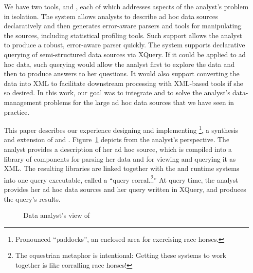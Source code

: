 
We have two tools, \pads{} and \Galax{}, each of which addresses aspects of the analyst's
problem in isolation.  The \pads{} system allows analysts to describe ad hoc data
sources declaratively and then generates error-aware parsers and tools
for manipulating the sources, including statistical profiling tools.
Such support allows the analyst to produce a robust, error-aware
parser quickly.  The \Galax{} system supports declarative querying of
semi-structured data sources via XQuery.  If it could be applied to ad
hoc data, such querying would allow the analyst first to explore the
data and then to produce answers to her questions.  It would also support
converting the data into XML to 
facilitate downstream processing with XML-based tools if she so
desired.  In this work, our goal was to integrate \pads{} and \Galax{}
to solve the analyst's data-management problems for the large ad hoc
data sources that we have seen in practice.

This paper describes our experience designing and implementing
\padx{}\footnote{%
  Pronounced ``paddocks'', an enclosed area for exercising race
  horses.},
a synthesis and extension of \pads{} and 
\Galax{}.  Figure~\ref{figure:padx-arch1} depicts \padx{} from the
analyst's perspective.  The analyst provides a \pads{} description of
her ad hoc source, which is compiled into a library of components for
parsing her data and for viewing and querying it as XML.  The
resulting libraries are linked together with the \pads{} and \Galax{}
runtime systems into one \padx{} query executable, called a ``query
corral.\footnote{%
   The equestrian metaphor is intentional: Getting these systems to
   work together is like corralling race horses!}''
At query time, the analyst provides her ad hoc data sources and her query
written in XQuery, and \padx{} produces the query's results.
\begin{figure}
\begin{center}
\end{center}
\caption{Data analyst's view of \padx{}}
\label{figure:padx-arch1}
\end{figure}


